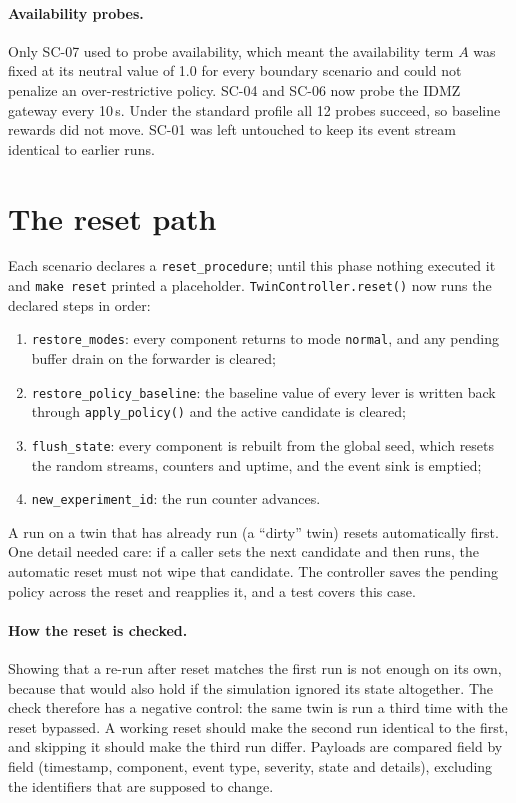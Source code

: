 \documentclass[11pt]{article}
\newcommand{\code}[1]{\texttt{\small #1}}
\begin{document}
\paragraph{Availability probes.} Only SC-07 used to probe availability, which meant
the availability term $A$ was fixed at its neutral value of 1.0 for every
boundary scenario and could not penalize an over-restrictive policy. SC-04 and
SC-06 now probe the IDMZ gateway every 10\,s. Under the standard profile all 12
probes succeed, so baseline rewards did not move. SC-01 was left untouched to keep
its event stream identical to earlier runs.

\section{The reset path}
\label{sec:reset}
Each scenario declares a \code{reset\_procedure}; until this phase nothing executed
it and \code{make reset} printed a placeholder. \code{TwinController.reset()} now
runs the declared steps in order:
\begin{enumerate}[leftmargin=1.6em,itemsep=1pt]
\item \code{restore\_modes}: every component returns to mode \code{normal}, and any
pending buffer drain on the forwarder is cleared;
\item \code{restore\_policy\_baseline}: the baseline value of every lever is written
back through \code{apply\_policy()} and the active candidate is cleared;
\item \code{flush\_state}: every component is rebuilt from the global seed, which
resets the random streams, counters and uptime, and the event sink is emptied;
\item \code{new\_experiment\_id}: the run counter advances.
\end{enumerate}
A run on a twin that has already run (a ``dirty'' twin) resets automatically
first. One detail needed care: if a caller sets the next candidate and then runs,
the automatic reset must not wipe that candidate. The controller saves the
pending policy across the reset and reapplies it, and a test covers this case.

\paragraph{How the reset is checked.} Showing that a re-run after reset matches the
first run is not enough on its own, because that would also hold if the
simulation ignored its state altogether. The check therefore has a negative
control: the same twin is run a third time with the reset bypassed. A working
reset should make the second run identical to the first, and skipping it should
make the third run differ. Payloads are compared field by field (timestamp,
component, event type, severity, state and details), excluding the identifiers
that are supposed to change.
\end{document}
